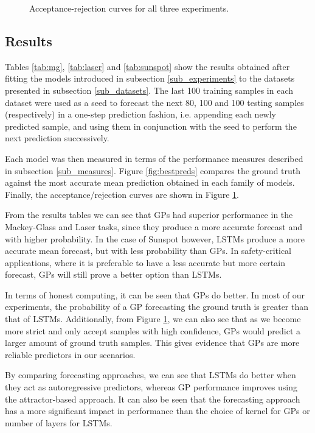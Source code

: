 \documentclass[pdftex,10pt,a4paper,journal]{article}
\theoremstyle{definition}
\theoremstyle{remark}
\begin{document}
\begin{multicols}{2}
\begin{figure}[ht]
    \caption{Acceptance-rejection curves for all three experiments.}\label{fig:accrej}
\end{figure}


\subsection{Results} \label{sub_res}
Tables \ref{tab:mg}, \ref{tab:laser} and \ref{tab:sunspot} show the results obtained after fitting the models introduced in subsection \ref{sub_experiments} to the datasets presented in subsection \ref{sub_datasets}. The last 100 training samples in each dataset were used as a seed to forecast the next 80, 100 and 100 testing samples (respectively) in a one-step prediction fashion, i.e. appending each newly predicted sample, and using them in conjunction with the seed to perform the next prediction successively. 
\par Each model was then measured in terms of the performance measures described in subsection \ref{sub_measures}. Figure \ref{fig:bestpreds} compares the ground truth against the most accurate mean prediction obtained in each family of models. Finally, the acceptance/rejection curves are shown in Figure \ref{fig:accrej}. 

\par From the results tables we can see that GPs had superior performance in the Mackey-Glass and Laser tasks, since they produce a more accurate forecast and with higher probability. In the case of Sunspot however, LSTMs produce a more accurate mean forecast, but with less probability than GPs. In safety-critical applications, where it is preferable to have a less accurate but more certain forecast, GPs will still prove a better option than LSTMs.

\par In terms of honest computing, it can be seen that GPs do better. In most of our experiments, the probability of a GP forecasting the ground truth is greater than that of LSTMs. Additionally, from Figure \ref{fig:accrej}, we can also see that as we become more strict and only accept samples with high confidence, GPs would predict a larger amount of ground truth samples. This gives evidence that GPs are more reliable predictors in our scenarios.

\par By comparing forecasting approaches, we can see that LSTMs do better when they act as autoregressive predictors, whereas GP performance improves using the attractor-based approach. It can also be seen that the forecasting approach has a more significant impact in performance than the choice of kernel for GPs or number of layers for LSTMs. 


\end{multicols}
\end{document}
